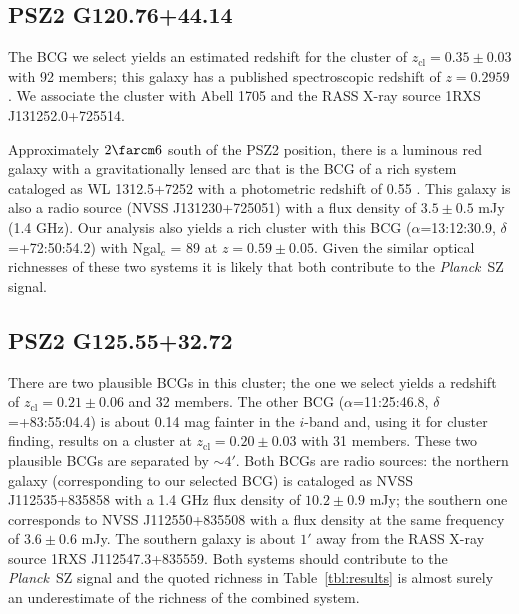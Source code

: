 \documentclass[apj, revtex4-1]{emulateapj}
\newcommand{\planck}{\textit{Planck}}
\newcommand{\sdssi}{\hbox{$i$}}
\begin{document}
\subsection{PSZ2 G120.76+44.14} %
The BCG we select yields an estimated redshift for the cluster of $z_\mathrm{cl} = 0.35 \pm 0.03$ with 92 members; this galaxy has a published spectroscopic redshift of $z=0.2959$ \citep{Huchra1990}. We associate the cluster with Abell 1705 and the RASS X-ray source 1RXS J131252.0+725514.

Approximately $2\farcm6$ south of the PSZ2 position, there is a luminous red galaxy with a gravitationally lensed arc that is the BCG of a rich system cataloged as WL 1312.5+7252 with a photometric redshift of 0.55 \citep{Dahle2003}. This galaxy is also a radio source (NVSS J131230+725051) with a flux density of $3.5 \pm 0.5$ mJy (1.4 GHz). Our analysis also yields a rich cluster with this BCG ($\alpha$=13:12:30.9, $\delta$=+72:50:54.2) with Ngal$_c$ = 89 at $z=0.59 \pm 0.05$. Given the similar optical richnesses of these two systems it is likely that both contribute to the \planck\ SZ signal.


\subsection{PSZ2 G125.55+32.72} %
There are two plausible BCGs in this cluster; the one we select yields a redshift of $z_\mathrm{cl} = 0.21 \pm 0.06$ and 32 members. The other BCG ($\alpha$=11:25:46.8, $\delta$=+83:55:04.4) is about 0.14 mag fainter in the \sdssi-band and, using it for cluster finding, results on a cluster at $z_\mathrm{cl} = 0.20 \pm 0.03$ with 31 members. These two plausible BCGs are separated by $\sim4'$. Both BCGs are radio sources: the northern galaxy (corresponding to our selected BCG) is cataloged as NVSS J112535+835858 with a 1.4 GHz flux density of $10.2 \pm 0.9$ mJy; the southern one corresponds to NVSS J112550+835508 with a flux density at the same frequency of $3.6 \pm 0.6$ mJy. The southern galaxy is about $1'$ away from the RASS X-ray source 1RXS J112547.3+835559. Both systems should contribute to the \planck\ SZ signal and the quoted richness in Table~\ref{tbl:results} is almost surely an underestimate of the richness of the combined system.

\end{document}
